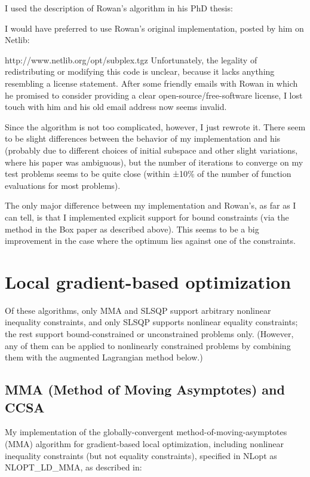 I used the description of Rowan's algorithm in his PhD thesis: \cite{Rowan_1990}

I would have preferred to use Rowan's original implementation, posted by him on Netlib: 

http://www.netlib.org/opt/subplex.tgz 
Unfortunately, the legality of redistributing or modifying this code is unclear, because it lacks anything resembling a license statement. After some friendly emails with Rowan in which he promised to consider providing a clear open-source/free-software license, I lost touch with him and his old email address now seems invalid. 

Since the algorithm is not too complicated, however, I just rewrote it. There seem to be slight differences between the behavior of my implementation and his (probably due to different choices of initial subspace and other slight variations, where his paper was ambiguous), but the number of iterations to converge on my test problems seems to be quite close (within ±10\% of the number of function evaluations for most problems). 

The only major difference between my implementation and Rowan's, as far as I can tell, is that I implemented explicit support for bound constraints (via the method in the Box paper as described above). This seems to be a big improvement in the case where the optimum lies against one of the constraints. 




\section{Local gradient-based optimization}
\label{LocalGradientBasedOptimization}

Of these algorithms, only MMA and SLSQP support arbitrary nonlinear inequality constraints, and only SLSQP supports nonlinear equality constraints; the rest support bound-constrained or unconstrained problems only. (However, any of them can be applied to nonlinearly constrained problems by combining them with the augmented Lagrangian method below.) 


\subsection{MMA (Method of Moving Asymptotes) and CCSA}
My implementation of the globally-convergent method-of-moving-asymptotes (MMA) algorithm for gradient-based local optimization, including nonlinear inequality constraints (but not equality constraints), specified in NLopt as NLOPT\_LD\_MMA, as described in: \cite{Svanberg_2002}


